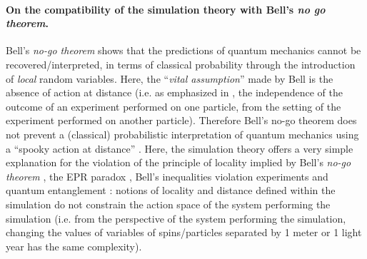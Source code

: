 \documentclass[11pt]{article}
\theoremstyle{definition}
\begin{document}
\paragraph{On the compatibility of the simulation theory with Bell's \emph{no go theorem}.}
Bell's \emph{no-go theorem} shows that the predictions of quantum mechanics cannot be recovered/interpreted, in terms of classical probability through the introduction of \emph{local} random variables. Here, the ``\emph{vital assumption}'' \cite[p.~2]{Bell1964a} made by Bell is the absence of action at distance (i.e. as emphasized in \cite[eq.~1]{Bell1964a}, the independence of the outcome of an experiment performed on one particle, from the setting of the experiment performed on another particle).
Therefore Bell's no-go theorem does not prevent a (classical) probabilistic interpretation of quantum mechanics using a  ``spooky action at distance'' \cite{EPR1935}.
Here, the simulation theory offers a very simple explanation for the violation of the principle of locality implied by Bell's \emph{no-go theorem} \cite{Bell1964a}, the EPR paradox \cite{EPR1935}, Bell's inequalities violation experiments \cite{aspect1982experimental, aspect1982experimentalbis} and quantum entanglement \cite{horodecki2009quantum}: notions of locality and distance defined within the simulation do not constrain  the action space of the system performing the simulation (i.e. from the perspective of the system performing the simulation, changing the values of variables of spins/particles separated by 1 meter or 1 light year has the same complexity).
\end{document}
